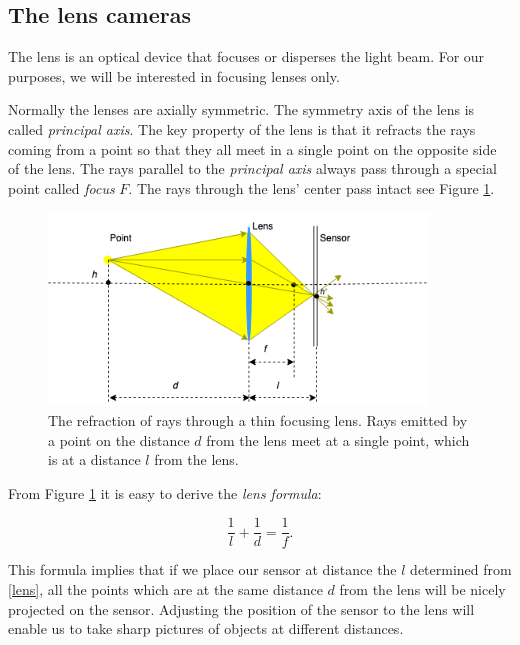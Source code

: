 \documentclass[a4paper,10pt]{article}
\begin{document}
\subsection{The lens cameras}

The lens is an optical device that focuses or disperses the light beam. For our purposes, we will be interested in focusing lenses only. 

Normally the lenses are axially symmetric. The symmetry axis of the lens is called  {\it principal axis}. The key property of the lens is that it refracts the rays coming from a point so that they all meet in a single point on the opposite side of the lens. The rays parallel to the {\it principal axis} always pass through a special point called {\it focus} $F$. The rays through the lens' center pass intact see Figure \ref{fig:lens}.

\begin{figure}[h]
\centering
 \includegraphics[width=0.9\textwidth]{../../images/lens.png}
 \caption{The refraction of rays through a thin focusing lens. Rays emitted by a point on the distance $d$ from the lens meet at a single point, which is at a distance $l$ from the lens.}
 \label{fig:lens}
\end{figure}

From Figure \ref{fig:lens} it is easy to derive the {\it lens formula}:

\begin{equation}
 \frac{1}{l} + \frac{1}{d} = \frac{1}{f}.
 \label{lens}
\end{equation}

This formula implies that if we place our sensor at distance the $l$ determined from \eqref{lens}, all the points which are at the same distance $d$ from the lens will be nicely projected on the sensor. Adjusting the position of the sensor to the lens will enable us to take sharp pictures of objects at different distances. 
\end{document}

